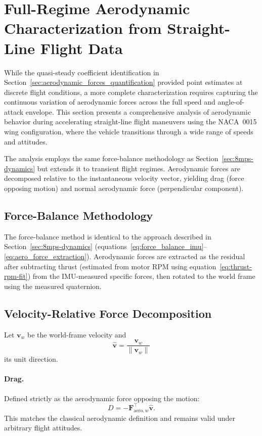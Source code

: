 \section{Full-Regime Aerodynamic Characterization from Straight-Line Flight Data}\label{sec:full-regime-aero}

While the quasi-steady coefficient identification in Section~\ref{sec:aerodynamic_forces_quantification} provided point estimates at discrete flight conditions, a more complete characterization requires capturing the continuous variation of aerodynamic forces across the full speed and angle-of-attack envelope.
This section presents a comprehensive analysis of aerodynamic behavior during accelerating straight-line flight maneuvers using the NACA~0015 wing configuration, where the vehicle transitions through a wide range of speeds and attitudes.

The analysis employs the same force-balance methodology as Section~\ref{sec:8mps-dynamics} but extends it to transient flight regimes.
Aerodynamic forces are decomposed relative to the instantaneous velocity vector, yielding drag (force opposing motion) and normal aerodynamic force (perpendicular component).

\subsection{Force-Balance Methodology}\label{sec:force-balance-full}

The force-balance method is identical to the approach described in Section~\ref{sec:8mps-dynamics} (equations~\eqref{eq:force_balance_imu}--\eqref{eq:aero_force_extraction}).
Aerodynamic forces are extracted as the residual after subtracting thrust (estimated from motor RPM using equation~\eqref{eq:thrust-rpm-fit}) from the IMU-measured specific forces, then rotated to the world frame using the measured quaternion.

\subsection{Velocity-Relative Force Decomposition}\label{sec:velocity-decomposition}

Let $\mathbf{v}_w$ be the world-frame velocity and
\begin{equation}
\hat{\mathbf{v}} = \frac{\mathbf{v}_w}{\|\mathbf{v}_w\|}
\label{eq:velocity_unit_vector}
\end{equation}
its unit direction.

\paragraph{Drag.}
Defined strictly as the aerodynamic force opposing the motion:
\begin{equation}
D = -\mathbf{F}_{\text{aero},w}^\top \hat{\mathbf{v}}.
\label{eq:drag_velocity_based}
\end{equation}
This matches the classical aerodynamic definition and remains valid under arbitrary flight attitudes.

